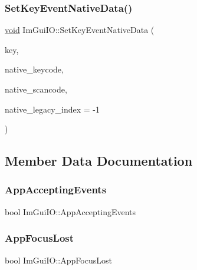 \mbox{\label{structImGuiIO_a6b2fa57fb6af5aa1c99f58115542e1dc}} 
\subsubsection{\texorpdfstring{Set\+Key\+Event\+Native\+Data()}{SetKeyEventNativeData()}}
{\footnotesize\ttfamily \hyperlink{imgui__impl__opengl3__loader_8h_ac668e7cffd9e2e9cfee428b9b2f34fa7}{void} Im\+Gui\+I\+O\+::\+Set\+Key\+Event\+Native\+Data (\begin{DoxyParamCaption}\item[{\hyperlink{imgui_8h_aa22ffe36b188427d712447ec465203d4}{Im\+Gui\+Key}}]{key,  }\item[{int}]{native\+\_\+keycode,  }\item[{int}]{native\+\_\+scancode,  }\item[{int}]{native\+\_\+legacy\+\_\+index = {\ttfamily -\/1} }\end{DoxyParamCaption})}



\subsection{Member Data Documentation}
\mbox{\label{structImGuiIO_aadb8a762b7a874e9d1f47230a5d62239}} 
\subsubsection{\texorpdfstring{App\+Accepting\+Events}{AppAcceptingEvents}}
{\footnotesize\ttfamily bool Im\+Gui\+I\+O\+::\+App\+Accepting\+Events}

\mbox{\label{structImGuiIO_a6f907c3044fe77b706f48ee6d7eaa1b2}} 
\subsubsection{\texorpdfstring{App\+Focus\+Lost}{AppFocusLost}}
{\footnotesize\ttfamily bool Im\+Gui\+I\+O\+::\+App\+Focus\+Lost}

